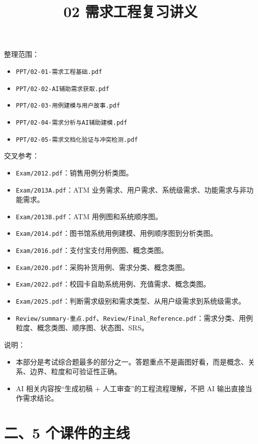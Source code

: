 \documentclass[UTF8,zihao=-4]{ctexart}
\title{02 需求工程复习讲义}
\author{}
\date{}
\begin{document}
\maketitle
\tableofcontents
\newpage


整理范围：

\begin{itemize}
\item \texttt{PPT/02-01-需求工程基础.pdf}
\item \texttt{PPT/02-02-AI辅助需求获取.pdf}
\item \texttt{PPT/02-03-用例建模与用户故事.pdf}
\item \texttt{PPT/02-04-需求分析与AI辅助建模.pdf}
\item \texttt{PPT/02-05-需求文档化验证与冲突检测.pdf}
\end{itemize}

交叉参考：

\begin{itemize}
\item \texttt{Exam/2012.pdf}：销售用例分析类图。
\item \texttt{Exam/2013A.pdf}：ATM 业务需求、用户需求、系统级需求、功能需求与非功能需求。
\item \texttt{Exam/2013B.pdf}：ATM 用例图和系统顺序图。
\item \texttt{Exam/2014.pdf}：图书馆系统用例建模、用例顺序图到分析类图。
\item \texttt{Exam/2016.pdf}：支付宝支付用例图、概念类图。
\item \texttt{Exam/2020.pdf}：采购补货用例、需求分类、概念类图。
\item \texttt{Exam/2022.pdf}：校园卡自助系统用例、充值需求、概念类图。
\item \texttt{Exam/2025.pdf}：判断需求级别和需求类型、从用户级需求到系统级需求。
\item \texttt{Review/summary-重点.pdf}、\texttt{Review/Final\_Reference.pdf}：需求分类、用例粒度、概念类图、顺序图、状态图、SRS。
\end{itemize}

说明：

\begin{itemize}
\item 本部分是考试综合题最多的部分之一。答题重点不是画图好看，而是概念、关系、边界、粒度和可验证性正确。
\item AI 相关内容按“生成初稿 + 人工审查”的工程流程理解，不把 AI 输出直接当作需求结论。
\end{itemize}

\section{二、5 个课件的主线}
\end{document}
